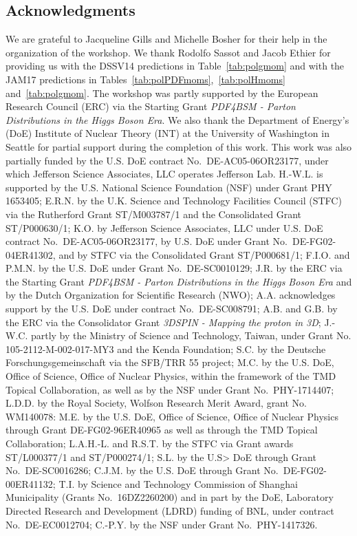 \subsection*{Acknowledgments}

We are grateful to Jacqueline Gills and Michelle Bosher for their help in the
organization of the workshop.
%
We thank Rodolfo Sassot and Jacob Ethier for providing us with the 
DSSV14 predictions in Table~\ref{tab:polgmom} and with the JAM17 predictions in
Tables~\ref{tab:polPDFmoms},~\ref{tab:polHmoms} and~\ref{tab:polgmom}.
%
The workshop was partly supported by the European Research Council (ERC) via 
the Starting Grant {\it PDF4BSM - Parton Distributions in the Higgs Boson Era}.
%
We also thank the Department of Energy's (DoE) Institute of Nuclear Theory 
(INT) at the University of Washington in Seattle for partial support during 
the completion of this work.
%
This work was also partially funded by the U.S. DoE contract 
No.~DE-AC05-06OR23177, under which Jefferson Science Associates, 
LLC operates Jefferson Lab. 
% 
H.-W.L. is supported by the U.S. National Science Foundation (NSF) under Grant 
PHY 1653405; E.R.N. by the U.K. Science and Technology Facilities Council 
(STFC) via the Rutherford Grant ST/M003787/1 and the Consolidated Grant 
ST/P000630/1; K.O. by Jefferson Science Associates, LLC under U.S. 
DoE contract No.~DE-AC05-06OR23177, 
by U.S. DoE under Grant No.~DE-FG02-04ER41302, 
and by STFC via the Consolidated Grant ST/P000681/1; 
F.I.O. and P.M.N. by the U.S. 
DoE under Grant No.~DE-SC0010129; J.R. by the ERC via the Starting 
Grant {\it PDF4BSM - Parton Distributions in the Higgs Boson Era} and by the 
Dutch Organization for Scientific Research (NWO);
%
A.A. acknowledges support by the U.S. DoE under contract No.~DE-SC008791;
A.B. and G.B. by the ERC via the Consolidator Grant {\it 3DSPIN - Mapping the
proton in 3D};
J.-W.C. partly by the Ministry of Science and Technology, Taiwan,
under Grant No. 105-2112-M-002-017-MY3 and the Kenda Foundation;
S.C. by the Deutsche Forschungsgemeinschaft via the SFB/TRR 55 project;
M.C. by the U.S. DoE, Office of Science, Office of Nuclear Physics, within the 
framework of the TMD Topical Collaboration, as well as by the NSF under Grant 
No.~PHY-1714407;
L.D.D. by the Royal Society, Wolfson Research Merit Award,
grant No. WM140078:
M.E. by the U.S. DoE, Office of Science, Office of Nuclear Physics through 
Grant DE-FG02-96ER40965 as well as through the TMD Topical Collaboration;
L.A.H.-L. and R.S.T. by the STFC via Grant awards ST/L000377/1 and ST/P000274/1;
S.L. by the U.S> DoE through Grant No.~DE-SC0016286;
C.J.M. by the U.S. DoE through Grant No.~DE-FG02-00ER41132;
T.I. by Science and Technology Commission of Shanghai Municipality 
(Grants No.~16DZ2260200) and in part by the DoE, Laboratory Directed Research 
and Development (LDRD) funding of BNL, under contract No.~DE-EC0012704;
C.-P.Y. by the NSF under Grant No.~PHY-1417326.



